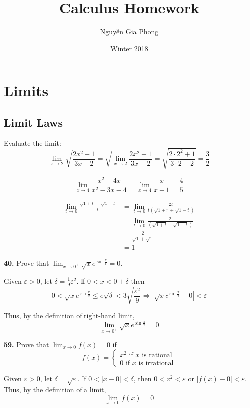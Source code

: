 \documentclass[a4paper,12pt]{article}
\title{Calculus Homework}
\author{Nguyễn Gia Phong}
\date{Winter 2018}
\begin{document}
\maketitle
\setcounter{section}{1}
\section{Limits}

\setcounter{subsection}{2}
\subsection{Limit Laws}
Evaluate the limit:
\[\lim_{x \to 2}\sqrt{\frac{2x^2 + 1}{3x - 2}}
= \sqrt{\lim_{x \to 2}\frac{2x^2 + 1}{3x - 2}}
= \sqrt{\frac{2 \cdot 2^2 + 1}{3 \cdot 2 - 2}}
= \frac{3}{2} \tag{9}\]

\[\lim_{x \to 4}\frac{x^2 - 4x}{x^2 - 3x - 4}
= \lim_{x \to 4}\frac{x}{x + 1}
= \frac{4}{5} \tag{12}\]

\begin{align*}
   \lim_{t \to 0}\frac{\sqrt{1 + t} - \sqrt{1 - t}}{t}
&= \lim_{t \to 0}\frac{2t}{t(\sqrt{1 + t} + \sqrt{1 - t})} \\
&= \lim_{t \to 0}\frac{2}{(\sqrt{1 + t} + \sqrt{1 - t})} \\
&= \frac{2}{\sqrt{1} + \sqrt{1}} \\
&= 1 \tag{25}
\end{align*}

\noindent\textbf{40. }Prove that
$\lim_{x \to 0^+}\sqrt{x}e^{\sin\frac{\pi}{x}} = 0$.

Given $\varepsilon > 0$, let $\delta = \frac{1}{9}\varepsilon^2$.
If $0 < x < 0 + \delta$ then \[0 < \sqrt{x}e^{\sin\frac{\pi}{x}}
\leq e\sqrt{\delta} < 3\sqrt{\frac{\varepsilon^2}{9}}
\Longrightarrow |\sqrt{x}e^{\sin\frac{\pi}{x}} - 0 | < \varepsilon\]

Thus, by the definition of right-hand limit,
\[\lim_{x \to 0^+}\sqrt{x}e^{\sin\frac{\pi}{x}} = 0\]

\noindent\textbf{59. }Prove that $\lim_{x \to 0}f(x) = 0$ if
\[f(x) = \begin{cases}
           x^2\text{ if } x\text{ is rational} \\
           0\text{ if } x\text{ is irrational}
         \end{cases}\]

Given $\varepsilon > 0$, let $\delta = \sqrt{\varepsilon}$.
If $0 < |x - 0| < \delta$, then $0 < x^2 < \varepsilon$
or $|f(x) - 0| < \varepsilon$. Thus, by the definition of a limit,
\[\lim_{x \to 0}f(x) = 0\]
\end{document}
